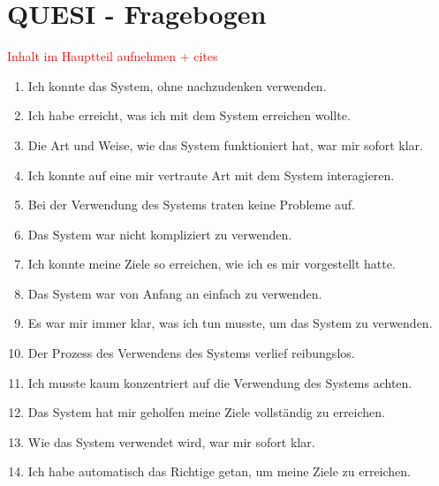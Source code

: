 \section{QUESI - Fragebogen}
\textcolor{red}{Inhalt im Hauptteil aufnehmen + cites} \cite{quesi-benchmarks, quesi-short}

\begin{enumerate}
    \item Ich konnte das System, ohne nachzudenken verwenden.
    \item Ich habe erreicht, was ich mit dem System erreichen wollte.
    \item Die Art und Weise, wie das System funktioniert hat, war mir sofort klar.
    \item Ich konnte auf eine mir vertraute Art mit dem System interagieren.
    \item Bei der Verwendung des Systems traten keine Probleme auf.
    \item Das System war nicht kompliziert zu verwenden.
    \item Ich konnte meine Ziele so erreichen, wie ich es mir vorgestellt hatte.
    \item Das System war von Anfang an einfach zu verwenden.
    \item Es war mir immer klar, was ich tun musste, um das System zu verwenden.
    \item Der Prozess des Verwendens des Systems verlief reibungslos.
    \item Ich musste kaum konzentriert auf die Verwendung des Systems achten.
    \item Das System hat mir geholfen meine Ziele vollständig zu erreichen.
    \item Wie das System verwendet wird, war mir sofort klar.
    \item Ich habe automatisch das Richtige getan, um meine Ziele zu erreichen.
\end{enumerate}
